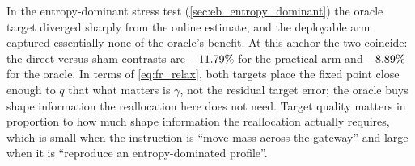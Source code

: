 \begin{remark}
\label{rem:gw_deployable}
In the entropy-dominant stress test (\cref{sec:eb_entropy_dominant}) the oracle target
diverged sharply from the online estimate, and the deployable arm captured essentially none
of the oracle's benefit. At this anchor the two coincide: the direct-versus-sham contrasts are
$-11.79\%$ for the practical arm and $-8.89\%$ for the oracle. In terms of
\cref{eq:fr_relax}, both targets place the fixed point close enough to $q$ that what matters
is $\gamma$, not the residual target error; the oracle buys shape information the
reallocation here does not need. Target quality matters in proportion to how much shape
information the reallocation actually requires, which is small when the instruction is
``move mass across the gateway'' and large when it is ``reproduce an entropy-dominated
profile''.
\end{remark}
